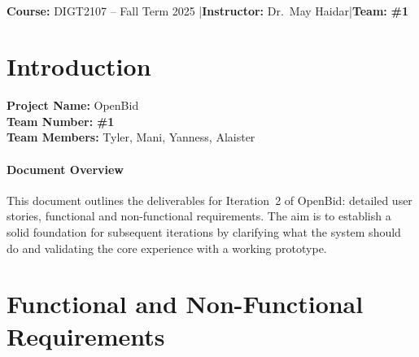 \documentclass[11pt]{article}
\title{\course\\\large \iteration\\[6pt]\project}
\author{\teammates}
\date{\duedate}
\newcommand{\project}{OpenBid}
\newcommand{\instructor}{Dr.\ May Haidar}
\newcommand{\teamnum}{1}
\newcommand{\teammates}{Tyler, Mani, Yanness, Alaister}
\begin{document}
\maketitle

\begin{center}
\textbf{Course:} DIGT2107 -- Fall Term 2025 \quad|\quad \textbf{Instructor:} \instructor \quad|\quad \textbf{Team:} \textbf{\#\teamnum}
\end{center}

\tableofcontents
\newpage

\section{Introduction}
\textbf{Project Name:} \project\\
\textbf{Team Number:} \textbf{\#\teamnum}\\
\textbf{Team Members:} \teammates

\paragraph{Document Overview}
This document outlines the deliverables for Iteration~2 of \project: detailed user stories, functional and non-functional requirements. The aim is to establish a solid foundation for subsequent iterations by clarifying what the system should do and validating the core experience with a working prototype.

\section{Functional and Non-Functional Requirements}
\end{document}
